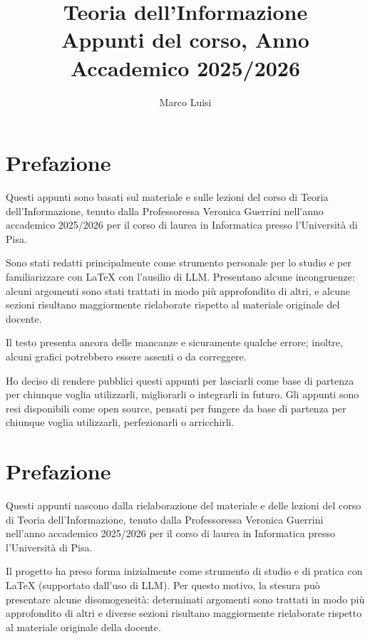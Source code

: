 \documentclass[a4paper,twoside,openany]{book}
\begin{document}
\frontmatter
\title{\huge Teoria dell'Informazione \\ \vspace{0.5em} \large Appunti del corso, Anno Accademico 2025/2026}
\author{Marco Luisi}
\date{}
\maketitle

\chapter*{Prefazione}
Questi appunti sono basati sul materiale e sulle lezioni del corso di Teoria dell'Informazione, tenuto dalla Professoressa Veronica Guerrini nell'anno accademico 2025/2026 per il corso di laurea in Informatica presso l'Università di Pisa.

Sono stati redatti principalmente come strumento personale per lo studio e per familiarizzare con LaTeX con l'ausilio di LLM.
Presentano alcune incongruenze: alcuni argomenti sono stati trattati in modo più approfondito di altri, e alcune sezioni risultano maggiormente rielaborate rispetto al materiale originale del docente. 

Il testo presenta ancora delle mancanze e sicuramente qualche errore; inoltre, alcuni grafici potrebbero essere assenti o da correggere.

Ho deciso di rendere pubblici questi appunti per lasciarli come base di partenza per chiunque voglia utilizzarli, migliorarli o integrarli in futuro.
Gli appunti sono resi disponibili come open source, pensati per fungere da base di partenza per chiunque voglia utilizzarli, perfezionarli o arricchirli.

\chapter*{Prefazione}
Questi appunti nascono dalla rielaborazione del materiale e delle lezioni del corso di Teoria dell'Informazione, tenuto dalla Professoressa Veronica Guerrini nell'anno accademico 2025/2026 per il corso di laurea in Informatica presso l'Università di Pisa.

Il progetto ha preso forma inizialmente come strumento di studio e di pratica con LaTeX (supportato dall'uso di LLM). Per questo motivo, la stesura può presentare alcune disomogeneità: determinati argomenti sono trattati in modo più approfondito di altri e diverse sezioni risultano maggiormente rielaborate rispetto al materiale originale della docente. 
\end{document}
